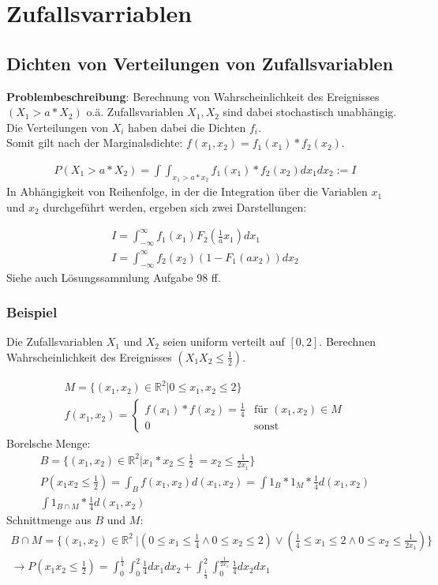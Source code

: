 \documentclass{article}
\begin{document}
\section{Zufallsvarriablen}
\subsection{Dichten von Verteilungen von Zufallsvariablen}
\textbf{Problembeschreibung}: Berechnung von Wahrscheinlichkeit des
Ereignisses $(X_1 > a * X_2)$ o.\"a.
Zufallsvariablen $X_1, X_2$  sind dabei stochastisch
unabh\"angig. Die Verteilungen von $X_i$ haben dabei die Dichten
$f_i$.\\
Somit gilt nach der Marginalsdichte: $f(x_1,x_2) = f_1(x_1)*f_2(x_2)$.

\begin{align}
	P(X_1 > a * X_2) = \int \int_{x_1>a*x_2} f_1(x_1)*f_2(x_2) dx_1dx_2 := I
\end{align}
In Abh\"angigkeit von Reihenfolge, in der die Integration \"uber die Variablen
$x_1$ und $x_2$ durchgef\"uhrt werden, ergeben sich zwei Darstellungen:

\begin{align}
	I = \int_{-\infty}^{\infty} f_1(x_1)F_2(\frac{1}{a}x_1)dx_1\\
	I = \int_{-\infty}^{\infty} f_2(x_2)(1 - F_1(ax_2))dx_2
\end{align}
Siehe auch L\"osungssammlung Aufgabe $98$ ff.

\subsubsection{Beispiel}
Die Zufallsvariablen $X_1$ und $X_2$ seien uniform verteilt auf
$[0, 2]$. Berechnen Wahrscheinlichkeit des Ereignisses $(X_1X_2 \leq \frac{1}{2})$.

\begin{align}
	M = \{(x_1, x_2) \in \mathbb{R}^2 | 0 \leq x_1,x_2 \leq 2\}\\
	f(x_1,x_2) =
	\begin{cases}
		f(x_1)*f(x_2) = \frac{1}{4} & \text{f\"ur } (x_1,x_2) \in M \\
		0 & \text{sonst}
	\end{cases}
\end{align}
Borelsche Menge:
\begin{align}
	B = \{(x_1, x_2) \in \mathbb{R}^2 | x_1*x_2 \leq \frac{1}{2}\ = x_2 \leq \frac{1}{2 x_1}\} \\
	P(x_1x_2 \leq \frac{1}{2}) = \int_B f(x_1, x_2) d(x_1, x_2) = \int 1_B*1_M*\frac{1}{4}
	d(x_1,x_2)\\
	\int 1_{B \cap M} * \frac{1}{4} d(x_1,x_2)
\end{align}
Schnittmenge aus $B$ und $M$:
\begin{align}
	B \cap M = \{(x_1, x_2) \in \mathbb{R}^2\ | (0 \leq x_1 \leq \frac{1}{4} \wedge 0 \leq x_2 \leq
	2) \vee (\frac{1}{4} \leq x_1 \leq 2 \wedge 0 \leq x_2 \leq \frac{1}{2x_1})\}\\
	\longrightarrow
	P(x_1x_2 \leq \frac{1}{2}) = \int^{\frac{1}{4}}_{0} \int^2_0 \frac{1}{4} dx_1dx_2
	+ \int^2_{\frac{1}{4}} \int^{\frac{1}{2x_1}}_0 \frac{1}{4} dx_2 dx_1
\end{align}
\end{document}
